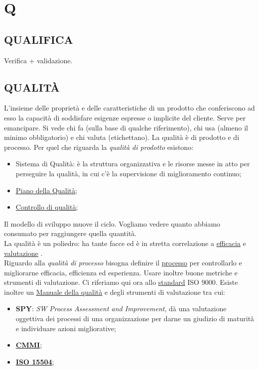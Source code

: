 \newpage
	\section{Q} \label{sec:Q}
	
		\subsection{QUALIFICA}  \label{qualifica}
		Verifica + validazione.  
	
		\subsection{QUALITÀ}  \label{qualita} %
		L’insieme delle proprietà e delle caratteristiche di un prodotto che conferiscono ad esso la capacità di soddisfare esigenze espresse o implicite del cliente. Serve per emancipare. Si vede chi fa (sulla base di qualche riferimento), chi usa (almeno il minimo obbligatorio) e chi valuta (etichettano).
		La qualità è di prodotto e di processo.
		Per quel che riguarda la \textit{qualità di prodotto} esistono:
		\begin{itemize}
			\item Sistema di Qualità: è la struttura organizzativa e le risorse messe in atto per perseguire la qualità, in cui c'è la supervisione di miglioramento continuo;
			\item \underline{\hyperref[pianoqualita]{Piano della Qualità}};
			\item \underline{\hyperref[controlloqualita]{Controllo di qualità}};				
		\end{itemize}
		Il modello di sviluppo muove il ciclo. Vogliamo vedere quanto abbiamo consumato per raggiungere quella quantità. \\
		La qualità è un poliedro: ha tante facce ed è in stretta correlazione a \underline{\hyperref[efficacia]{efficacia}} e \underline{\hyperref[valutazione]{valutazione}} . \\
		Riguardo alla \textit{qualità di processo} bisogna definire il \underline{\hyperref[processo]{processo}} per controllarlo e migliorarne efficacia, efficienza ed esperienza. Usare inoltre buone metriche e strumenti di valutazione. Ci riferiamo qui ora allo \underline{\hyperref[standard]{standard}} ISO 9000. Esiste inoltre un \underline{\hyperref[manualequalita]{Manuale della qualità}} e degli strumenti di valutazione tra cui:
		\begin{itemize}
			\item \textbf{SPY}: \textit{SW Process Assessment and Improvement}, dà una valutazione oggettiva dei processi di una organizzazione per darne un giudizio di maturità e individuare azioni migliorative;
			\item \textbf{\underline{\hyperref[cmmi]{CMMI}}};
			\item \textbf{\underline{\hyperref[15504]{ISO 15504}}};
		\end{itemize}
	
	
